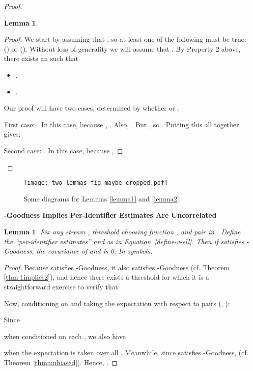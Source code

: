 \documentclass{article}
\newtheorem{lemma}[theorem]{Lemma}
\begin{document}
\begin{proof}
\begin{lemma}
\end{lemma}
\begin{proof}
\noindent We start by assuming that , so at least one of the following must be true: 
() or (). 
Without loss of generality we will assume that . 
\noindent By Property 2 above, there exists an  such that
\begin{itemize}
\item .
\item .
\end{itemize}

\noindent Our proof will have two cases, determined by whether 
 or .

\noindent First case: . In this case, because , . Also, .
But , so . Putting this all together gives:


\noindent Second case: . In this case,
because ,

\end{proof}
\end{proof}

\begin{figure*}
\begin{center}
\texttt{[image: two-lemmas-fig-maybe-cropped.pdf]}
\end{center}
\caption{Some diagrams for Lemmas \ref{lemma1} and \ref{lemma2}}
\end{figure*}

\noindent \textbf{-Goodness Implies Per-Identifier Estimates Are Uncorrelated}
 \label{sec:zerocovariance}


\begin{lemma} \label{lemma:zerocovariances} Fix any stream , threshold choosing function , and pair  in . Define the ``per-identifier estimates''  and  as in Equation~\eqref{define-v-ell}. Then
if  satisfies -Goodness, the covariance of  and  is 0. In symbols,

\end{lemma}
\begin{proof}
Because  satisfies -Goodness, it also satisfies -Goodness (cf. Theorem \ref{thm:1implies2}), and hence there exists a threshold  for which it is a straightforward 
exercise to verify that:



\noindent Now, conditioning on  and taking the expectation with respect to pairs (, ):



\noindent Since 

when conditioned on each 
, 
we also have

when the expectation is taken over all .
Meanwhile, since  satisfies -Goodness, 
 (cf. Theorem \ref{thm:unbiased}).
Hence, .
\end{proof}
\end{document}
